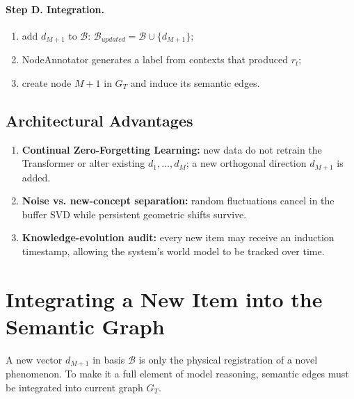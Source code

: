 \documentclass[11pt,a4paper]{article}
\begin{document}
\paragraph{Step D. Integration.}
\begin{enumerate}
\item add $d_{M+1}$ to $\mathcal B$: $\mathcal B_{updated}=\mathcal B\cup\{d_{M+1}\}$;
\item NodeAnnotator generates a label from contexts that produced $r_t$;
\item create node $M+1$ in $G_T$ and induce its semantic edges.
\end{enumerate}

\subsection*{Architectural Advantages}
\begin{enumerate}
\item \textbf{Continual Zero-Forgetting Learning:} new data do not retrain the Transformer or alter existing $d_1,\dots,d_M$; a new orthogonal direction $d_{M+1}$ is added.
\item \textbf{Noise vs. new-concept separation:} random fluctuations cancel in the buffer SVD while persistent geometric shifts survive.
\item \textbf{Knowledge-evolution audit:} every new item may receive an induction timestamp, allowing the system's world model to be tracked over time.
\end{enumerate}

\section{Integrating a New Item into the Semantic Graph}
A new vector $d_{M+1}$ in basis $\mathcal B$ is only the physical registration of a novel phenomenon. To make it a full element of model reasoning, semantic edges must be integrated into current graph $G_T$.
\end{document}
